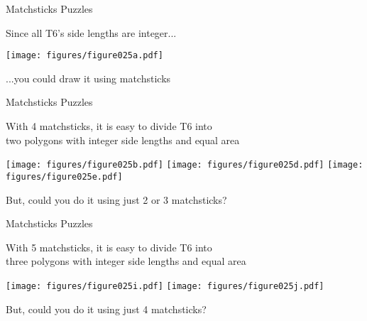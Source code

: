 \documentclass[14pt]{beamer}
\begin{document}

    \begin{frame}{Matchsticks Puzzles}
        \begin{center}
            Since all T6's side lengths are integer...

            \bigskip

            \texttt{[image: figures/figure025a.pdf]}

            \bigskip

            {...you could draw it using matchsticks}

            \bigskip\bigskip
        \end{center}
    \end{frame}


    \begin{frame}{Matchsticks Puzzles}
        \begin{center}
            {With 4 matchsticks, it is easy to divide T6 into\\[1ex]two polygons with integer side lengths and equal area}

            \bigskip\bigskip

            \texttt{[image: figures/figure025b.pdf]}\quad
            \texttt{[image: figures/figure025d.pdf]}\quad
            \texttt{[image: figures/figure025e.pdf]}\\

            \bigskip\bigskip

            {But, could you do it using just 2 or 3 matchsticks?}

            \bigskip\bigskip
        \end{center}
    \end{frame}


    \begin{frame}{Matchsticks Puzzles}
        \begin{center}
            {With 5 matchsticks, it is easy to divide T6 into\\[1ex]three polygons with integer side lengths and equal area}

            \bigskip\bigskip

            \texttt{[image: figures/figure025i.pdf]}\qquad
            \texttt{[image: figures/figure025j.pdf]}\\

            \bigskip\bigskip

            {But, could you do it using just 4 matchsticks?}

            \bigskip\bigskip
        \end{center}
    \end{frame}
\end{document}
